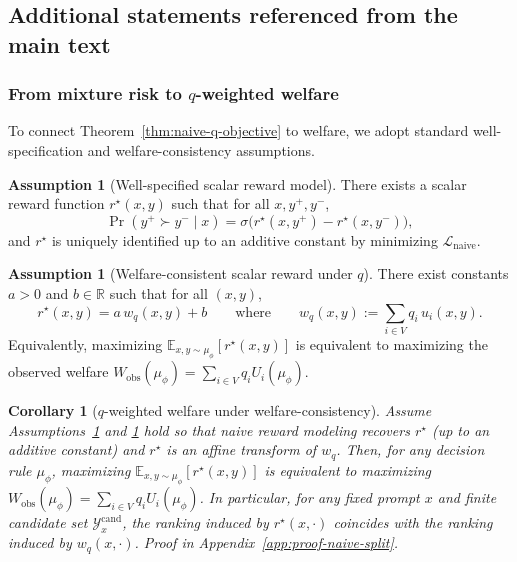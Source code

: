 \documentclass{article}
\theoremstyle{plain}
\newtheorem{corollary}[theorem]{Corollary}
\theoremstyle{definition}
\newtheorem{assumption}[theorem]{Assumption}
\theoremstyle{remark}
\begin{document}
\subsection{Additional statements referenced from the main text}
\label{app:theory-statements}

\subsubsection{From mixture risk to $q$-weighted welfare}
To connect Theorem~\ref{thm:naive-q-objective} to welfare, we adopt standard
well-specification and welfare-consistency assumptions.

\begin{assumption}[Well-specified scalar reward model]
\label{ass:well-specified}
There exists a scalar reward function $r^\star(x,y)$ such that for all
$x,y^+,y^-$,
\begin{equation}
    \Pr(y^+ \succ y^- \mid x)
    =
    \sigma\!\big(r^\star(x,y^+)-r^\star(x,y^-)\big),
    \label{eq:well-specified}
\end{equation}
and $r^\star$ is uniquely identified up to an additive constant by minimizing
$\mathcal{L}_{\text{naive}}$.
\end{assumption}

\begin{assumption}[Welfare-consistent scalar reward under $q$]
\label{ass:welfare-consistent}
There exist constants $a>0$ and $b\in\mathbb{R}$ such that for all $(x,y)$,
\begin{equation}
    r^\star(x,y)
    =
    a\,w_q(x,y)+b
    \qquad\text{where}\qquad
    w_q(x,y):=\sum_{i\in V} q_i\,u_i(x,y).
\end{equation}
Equivalently, maximizing $\mathbb{E}_{x,y\sim\mu_\phi}[r^\star(x,y)]$ is
equivalent to maximizing the observed welfare
$W_{\mathrm{obs}}(\mu_\phi)=\sum_{i\in V} q_i U_i(\mu_\phi)$.
\end{assumption}

\begin{corollary}[$q$-weighted welfare under welfare-consistency]
\label{cor:naive-q-weighted-welfare}
Assume Assumptions~\ref{ass:well-specified} and \ref{ass:welfare-consistent}
hold so that naive reward modeling recovers $r^\star$ (up to an additive
constant) and $r^\star$ is an affine transform of $w_q$.
Then, for any decision rule $\mu_\phi$,
maximizing $\mathbb{E}_{x,y\sim\mu_\phi}[r^\star(x,y)]$ is equivalent to
maximizing $W_{\mathrm{obs}}(\mu_\phi)=\sum_{i\in V}q_iU_i(\mu_\phi)$.
In particular, for any fixed prompt $x$ and finite candidate set
$\mathcal{Y}_x^{\mathrm{cand}}$, the ranking induced by $r^\star(x,\cdot)$
coincides with the ranking induced by $w_q(x,\cdot)$.
Proof in Appendix~\ref{app:proof-naive-split}.
\end{corollary}
\end{document}
